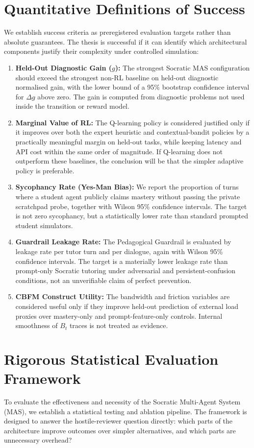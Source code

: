 \documentclass[11pt,a4paper]{report}
\begin{document}
\section{Quantitative Definitions of Success}
We establish success criteria as preregistered evaluation targets rather than absolute guarantees. The thesis is successful if it can identify which architectural components justify their complexity under controlled simulation:
\begin{enumerate}
    \item \textbf{Held-Out Diagnostic Gain ($g$):} The strongest Socratic MAS configuration should exceed the strongest non-RL baseline on held-out diagnostic normalised gain, with the lower bound of a 95\% bootstrap confidence interval for $\Delta g$ above zero. The gain is computed from diagnostic problems not used inside the transition or reward model.
    \item \textbf{Marginal Value of RL:} The Q-learning policy is considered justified only if it improves over both the expert heuristic and contextual-bandit policies by a practically meaningful margin on held-out tasks, while keeping latency and API cost within the same order of magnitude. If Q-learning does not outperform these baselines, the conclusion will be that the simpler adaptive policy is preferable.
    \item \textbf{Sycophancy Rate (Yes-Man Bias):} We report the proportion of turns where a student agent publicly claims mastery without passing the private scratchpad probe, together with Wilson 95\% confidence intervals. The target is not zero sycophancy, but a statistically lower rate than standard prompted student simulators.
    \item \textbf{Guardrail Leakage Rate:} The Pedagogical Guardrail is evaluated by leakage rate per tutor turn and per dialogue, again with Wilson 95\% confidence intervals. The target is a materially lower leakage rate than prompt-only Socratic tutoring under adversarial and persistent-confusion conditions, not an unverifiable claim of perfect prevention.
    \item \textbf{CBFM Construct Utility:} The bandwidth and friction variables are considered useful only if they improve held-out prediction of external load proxies over mastery-only and prompt-feature-only controls. Internal smoothness of $B_t$ traces is not treated as evidence.
\end{enumerate}

\section{Rigorous Statistical Evaluation Framework}
To evaluate the effectiveness and necessity of the Socratic Multi-Agent System (MAS), we establish a statistical testing and ablation pipeline. The framework is designed to answer the hostile-reviewer question directly: which parts of the architecture improve outcomes over simpler alternatives, and which parts are unnecessary overhead?
\end{document}
